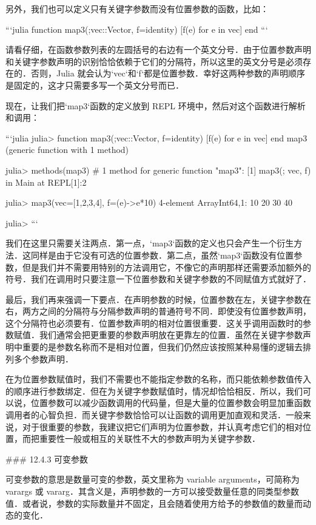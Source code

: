 另外，我们也可以定义只有关键字参数而没有位置参数的函数，比如：

```julia
function map3(;vec::Vector, f=identity)
    [f(e) for e in vec]
end
```

请看仔细，在函数参数列表的左圆括号的右边有一个英文分号．由于位置参数声明和关键字参数声明的识别恰恰依赖于它们的分隔符，所以这里的英文分号是必须存在的．否则，Julia 就会认为`vec`和`f`都是位置参数．幸好这两种参数的声明顺序是固定的，这才只需要多写一个英文分号而已．

现在，让我们把`map3`函数的定义放到 REPL 环境中，然后对这个函数进行解析和调用：

```julia
julia> function map3(;vec::Vector, f=identity)
           [f(e) for e in vec]
       end
map3 (generic function with 1 method)

julia> methods(map3)
# 1 method for generic function "map3":
[1] map3(; vec, f) in Main at REPL[1]:2

julia> map3(vec=[1,2,3,4], f=(e)->e*10)
4-element Array{Int64,1}:
 10
 20
 30
 40

julia>
```

我们在这里只需要关注两点．第一点，`map3`函数的定义也只会产生一个衍生方法．这同样是由于它没有可选的位置参数．第二点，虽然`map3`函数没有位置参数，但是我们并不需要用特别的方法调用它，不像它的声明那样还需要添加额外的符号．我们在调用时只要注意一下位置参数和关键字参数的不同赋值方式就好了．

最后，我们再来强调一下要点．在声明参数的时候，位置参数在左，关键字参数在右，两方之间的分隔符与分隔参数声明的普通符号不同．即使没有位置参数声明，这个分隔符也必须要有．位置参数声明的相对位置很重要．这关乎调用函数时的参数赋值．我们通常会把更重要的参数声明放在更靠左的位置．虽然在关键字参数声明中重要的是参数名称而不是相对位置，但我们仍然应该按照某种易懂的逻辑去排列多个参数声明．

在为位置参数赋值时，我们不需要也不能指定参数的名称，而只能依赖参数值传入的顺序进行参数绑定．但在为关键字参数赋值时，情况却恰恰相反．所以，我们可以说，位置参数可以减少函数调用的代码量，但是大量的位置参数会明显加重函数调用者的心智负担．而关键字参数恰恰可以让函数的调用更加直观和灵活．一般来说，对于很重要的参数，我建议把它们声明为位置参数，并认真考虑它们的相对位置，而把重要性一般或相互的关联性不大的参数声明为关键字参数．

### 12.4.3 可变参数

可变参数的意思是数量可变的参数，英文里称为 variable arguments，可简称为 varargs 或 vararg．其含义是，声明参数的一方可以接受数量任意的同类型参数值．或者说，参数的实际数量并不固定，且会随着使用方给予的参数值的数量而动态的变化．

